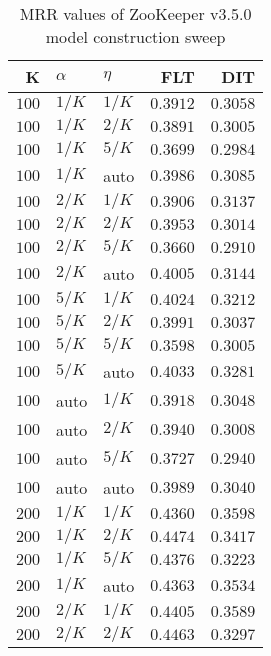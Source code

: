 
\begin{table}
\begin{spacing}{1.2}
\centering
\caption{MRR values of ZooKeeper v3.5.0 model construction sweep}
\label{table:zookeeper_model_sweep}
\vspace{0.2em}
\parbox{.45\linewidth}{\centering \begin{tabular}{rll|rr}
\toprule
    K &  $\alpha$ &    $\eta$ & FLT &   DIT \\
\midrule
$100$ &  $1/K$ &  $1/K$ &         $0.3912$ & $0.3058$ \\
$100$ &  $1/K$ &  $2/K$ &         $0.3891$ & $0.3005$ \\
$100$ &  $1/K$ &  $5/K$ &         $0.3699$ & $0.2984$ \\
$100$ &  $1/K$ &   auto &         $0.3986$ & $0.3085$ \\
$100$ &  $2/K$ &  $1/K$ &         $0.3906$ & $0.3137$ \\
$100$ &  $2/K$ &  $2/K$ &         $0.3953$ & $0.3014$ \\
$100$ &  $2/K$ &  $5/K$ &         $0.3660$ & $0.2910$ \\
$100$ &  $2/K$ &   auto &         $0.4005$ & $0.3144$ \\
$100$ &  $5/K$ &  $1/K$ &         $0.4024$ & $0.3212$ \\
$100$ &  $5/K$ &  $2/K$ &         $0.3991$ & $0.3037$ \\
$100$ &  $5/K$ &  $5/K$ &         $0.3598$ & $0.3005$ \\
$100$ &  $5/K$ &   auto &         $0.4033$ & $0.3281$ \\
$100$ &   auto &  $1/K$ &         $0.3918$ & $0.3048$ \\
$100$ &   auto &  $2/K$ &         $0.3940$ & $0.3008$ \\
$100$ &   auto &  $5/K$ &         $0.3727$ & $0.2940$ \\
$100$ &   auto &   auto &         $0.3989$ & $0.3040$ \\
$200$ &  $1/K$ &  $1/K$ &         $0.4360$ & $0.3598$ \\
$200$ &  $1/K$ &  $2/K$ &         $0.4474$ & $0.3417$ \\
$200$ &  $1/K$ &  $5/K$ &         $0.4376$ & $0.3223$ \\
$200$ &  $1/K$ &   auto &         $0.4363$ & $0.3534$ \\
$200$ &  $2/K$ &  $1/K$ &         $0.4405$ & $0.3589$ \\
$200$ &  $2/K$ &  $2/K$ &         $0.4463$ & $0.3297$ \\

\end{tabular}}
\end{spacing}
\end{table}
